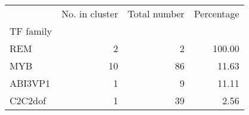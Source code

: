 \begin{tabular}{lrrr}
\toprule
{} &  No. in cluster &  Total number &  Percentage \\
TF family &                 &               &             \\
\midrule
REM       &               2 &             2 &      100.00 \\
MYB       &              10 &            86 &       11.63 \\
ABI3VP1   &               1 &             9 &       11.11 \\
C2C2dof   &               1 &            39 &        2.56 \\
\bottomrule
\end{tabular}
